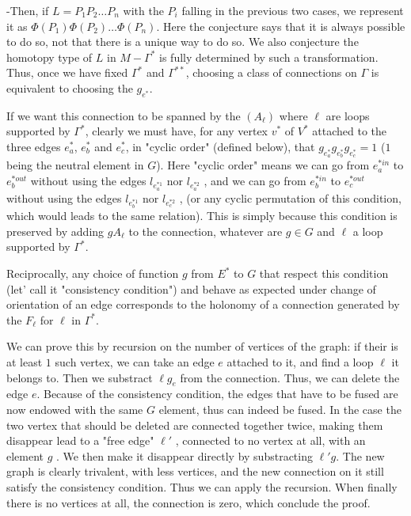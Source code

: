 \documentclass[10pt]{article}
\begin{document}
-Then, if $L=P_1 P_2 … P_n$ with the $P_i$ falling in the previous two cases, we represent it as $\Phi(P_1)\Phi(P_2)… \Phi(P_n)$.
Here the conjecture says that it is always possible to do so, not that there is a unique way to do so. We also conjecture the homotopy type of $L$ in $M-\Gamma^*$ is fully determined by such a transformation.\\

Thus, once we have fixed $\Gamma^*$ and $\Gamma^{**}$, choosing a class of connections on $\Gamma$ is equivalent to choosing the $g_{e^*}$.

If we want this connection to be spanned by the $(A_\ell)$ where $\ell$ are loops supported by $\Gamma^*$, clearly we must have, for any vertex $v^*$ of $V^*$ attached to the three edges $e^*_a$, $e^*_b$ and $e^*_c$, in "cyclic order" (defined below), that $g_{e^*_a}g_{e^*_b}g_{e^*_c}=1$ ($1$ being the neutral element in $G$). Here "cyclic order" means we can go from $e^{*in}_a$ to $e^{*out}_b$ without using the edges $l_{e^{*1}_a}$ nor
 $l_{e^{*2}_a}$ , and we can go from $e^{*in}_b$ to $e^{*out}_c$ without using the edges $l_{e^{*1}_b}$ nor $l_{e^{*2}_c}$ , (or any cyclic permutation of this condition, which would leads to the same relation). This is simply because this condition is preserved by adding $g A_\ell$ to the connection, whatever are $g\in G$ and $\ell$ a loop supported by $\Gamma^*$.

Reciprocally, any choice of function $g$ from $E^*$ to $G$ that respect  this condition (let’ call it "consistency condition") and behave as expected under change of orientation of an edge corresponds to the holonomy of a connection generated by the $F_\ell$ for $\ell$ in $\Gamma^*$.

We can prove this by recursion on the number of vertices of the graph: if their is at least $1$ such vertex, we can take an edge $e$ attached to it, and find a loop $\ell$ it belongs to. Then we substract $\ell g_e$ from the connection. Thus, we can delete the edge $e$. Because of the consistency condition, the edges that have to be fused are now endowed with the same $G$ element, thus can indeed be fused. In the case the two vertex that should be deleted are connected together twice, making them disappear lead to a "free edge"  $\ell'$ , connected to no vertex at all, with an element $g$ . We then make it disappear directly by substracting $\ell' g$. The new graph is clearly trivalent, with less vertices, and the new connection on it still satisfy the consistency condition. Thus we can apply the recursion. When finally there is no vertices at all, the connection is zero, which conclude the proof.
\end{document}
